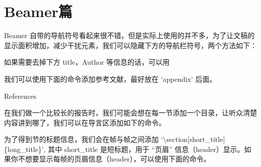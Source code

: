 
\section{Beamer篇}



Beamer
自带的导航符号看起来很不错，但是实际上使用的并不多，为了让文稿的显示面积增加，减少干扰元素，我们可以隐藏下方的导航栏符号，两个方法如下：

\begin{texinlist}
\beamertemplatenavigationsymbolsempty %
\end{texinlist}

如果需要去掉下方 title，Author 等信息的话，可以用

\begin{texinlist}
\end{texinlist}



我们可以使用下面的命令添加参考文献，最好放在 `appendix' 后面。

\begin{texinlist}
\begin{frame}[allowframebreaks]{References}
\def\newblock{}


\end{frame}
\end{texinlist}



在我们做一个比较长的报告时，我们可能会想在每一节添加一个目录，让听众清楚内容讲到哪了，我们可以在导言区添加如下的命令。

\begin{texinlist}
\end{texinlist}

为了得到节的标题信息，我们会在帧与帧之间添加
`\textbackslash{}section{[}short\_title{]}\{long\_title\}', 其中
short\_title 是短标题，用于 ``页眉''
信息（header）显示。如果你不想要显示每帧的页眉信息（header），可以使用下面的命令。

\begin{texinlist}
\end{texinlist}


